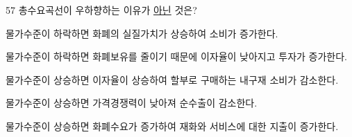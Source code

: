 \begin{question}{57}
총수요곡선이 우하향하는 이유가 \uline{아닌} 것은?
\begin{choices}
  \item 물가수준이 하락하면 화폐의 실질가치가 상승하여 소비가 증가한다.
  \item 물가수준이 하락하면 화폐보유를 줄이기 때문에 이자율이 낮아지고 투자가 증가한다.
  \item 물가수준이 상승하면 이자율이 상승하여 할부로 구매하는 내구재 소비가 감소한다.
  \item 물가수준이 상승하면 가격경쟁력이 낮아져 순수출이 감소한다.
  \item 물가수준이 상승하면 화폐수요가 증가하여 재화와 서비스에 대한 지출이 증가한다.
\end{choices}
\end{question}
